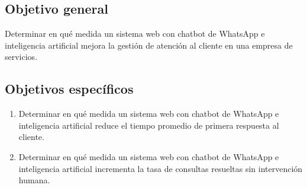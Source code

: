 \subsection{Objetivo general}
Determinar en qué medida un sistema web con chatbot de WhatsApp e inteligencia artificial mejora la gestión de atención al cliente en una empresa de servicios.

\subsection{Objetivos específicos}
\begin{enumerate}[label=\textbf{OE\arabic*:},leftmargin=1.27cm,itemsep=4pt]
\item Determinar en qué medida un sistema web con chatbot de WhatsApp e inteligencia artificial reduce el tiempo promedio de primera respuesta al cliente.
\item Determinar en qué medida un sistema web con chatbot de WhatsApp e inteligencia artificial incrementa la tasa de consultas resueltas sin intervención humana.
\end{enumerate}
